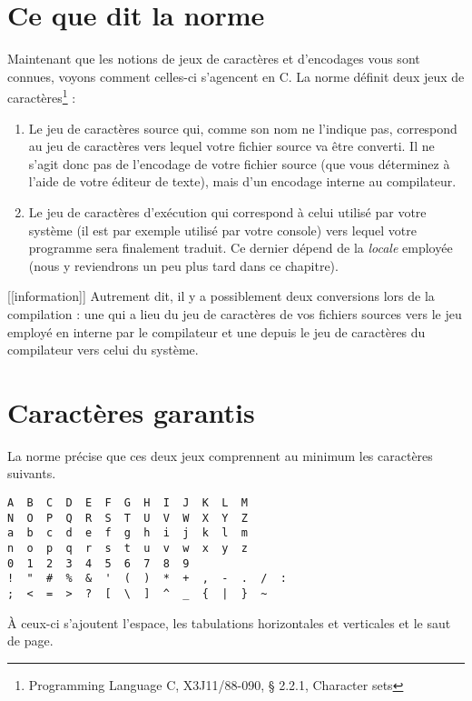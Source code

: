 \documentclass[]{article}
\providecommand{\tightlist}{%
  \setlength{\itemsep}{0pt}\setlength{\parskip}{0pt}}
\begin{document}
\section{Ce que dit la norme}\label{ce-que-dit-la-norme}

Maintenant que les notions de jeux de caractères et d'encodages vous
sont connues, voyons comment celles-ci s'agencent en C. La norme définit
deux jeux de caractères\footnote{Programming Language C, X3J11/88-090, §
  2.2.1, Character sets} :

\begin{enumerate}
\def\labelenumi{\arabic{enumi}.}
\tightlist
\item
  Le jeu de caractères source qui, comme son nom ne l'indique pas,
  correspond au jeu de caractères vers lequel votre fichier source va
  être converti. Il ne s'agit donc pas de l'encodage de votre fichier
  source (que vous déterminez à l'aide de votre éditeur de texte), mais
  d'un encodage interne au compilateur.
\item
  Le jeu de caractères d'exécution qui correspond à celui utilisé par
  votre système (il est par exemple utilisé par votre console) vers
  lequel votre programme sera finalement traduit. Ce dernier dépend de
  la \emph{locale} employée (nous y reviendrons un peu plus tard dans ce
  chapitre).
\end{enumerate}

{[}{[}information{]}{]} \textbar{} Autrement dit, il y a possiblement
deux conversions lors de la compilation : une qui a lieu du jeu de
caractères de vos fichiers sources vers le jeu employé en interne par le
compilateur et une depuis le jeu de caractères du compilateur vers celui
du système.

\section{Caractères garantis}\label{caractuxe8res-garantis}

La norme précise que ces deux jeux comprennent au minimum les caractères
suivants.

\begin{verbatim}
A  B  C  D  E  F  G  H  I  J  K  L  M
N  O  P  Q  R  S  T  U  V  W  X  Y  Z
a  b  c  d  e  f  g  h  i  j  k  l  m
n  o  p  q  r  s  t  u  v  w  x  y  z
0  1  2  3  4  5  6  7  8  9
!  "  #  %  &  '  (  )  *  +  ,  -  .  /  :
;  <  =  >  ?  [  \  ]  ^  _  {  |  }  ~
\end{verbatim}

À ceux-ci s'ajoutent l'espace, les tabulations horizontales et
verticales et le saut de page.
\end{document}
